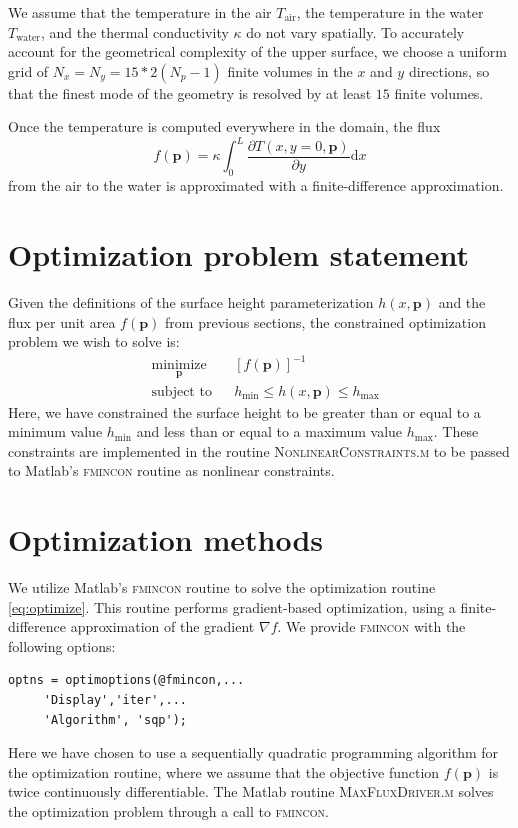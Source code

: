 \documentclass[11pt]{article}
\begin{document}
We assume that the temperature in the air $T_{\text{air}}$,
the temperature in the water $T_{\text{water}}$,
and the thermal conductivity $\kappa$ do not vary spatially.
To accurately account for the geometrical complexity of the upper
surface,
we choose a uniform grid of $N_x = N_y = 15*2(N_p-1)$
finite volumes in the $x$ and $y$ directions, so that the finest mode
of the geometry is resolved by at least $15$ finite volumes.

Once the temperature is computed everywhere in the domain,
the flux
\begin{equation}
f(\boldsymbol{p}) = \kappa \int_0^L
\frac{\partial T(x,y=0,\boldsymbol{p})}{\partial y} \text{d} x
\end{equation}
from the air to the water is approximated
with a finite-difference approximation.

\section{Optimization problem statement}

Given the definitions of the surface height parameterization
$h(x, \boldsymbol{p})$ and the flux per unit area $f(\boldsymbol{p})$
from previous sections, the constrained optimization problem we wish
to solve is: 
\begin{equation}
\begin{aligned}
& \underset{\boldsymbol{p}}{\text{minimize}}
& & \left[ f(\boldsymbol{p}) \right]^{-1} \\
& \text{subject to}
& & h_{\text{min}} \leq h(x, \boldsymbol{p}) \leq h_{\text{max}}
\end{aligned}
\label{eq:optimize}
\end{equation}
Here, we have constrained the surface height to be greater than
or equal to a minimum value $h_{\text{min}}$ and less than or equal
to a maximum value $h_{\text{max}}$. These constraints are
implemented in the routine \textsc{NonlinearConstraints.m}
to be passed to Matlab's \textsc{fmincon} routine as nonlinear
constraints.

\section{Optimization methods}

We utilize Matlab's \textsc{fmincon} routine to solve the
optimization routine \eqref{eq:optimize}. This routine performs
gradient-based optimization, using a finite-difference approximation
of the gradient $\nabla f$. We provide \textsc{fmincon} with the
following options:
\begin{verbatim}
optns = optimoptions(@fmincon,...
     'Display','iter',...
     'Algorithm', 'sqp');
\end{verbatim}
Here we have chosen to use a sequentially quadratic programming
algorithm for the optimization routine, where we assume that the
objective function $f(\boldsymbol{p})$ is twice continuously
differentiable. The Matlab routine \textsc{MaxFluxDriver.m} solves
the optimization problem through a call to \textsc{fmincon}.
\end{document}
